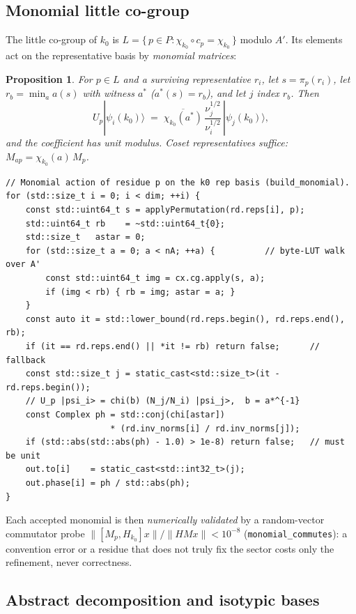 \documentclass[11pt]{article}
\newtheorem{prop}{Proposition}[section]
\newcommand{\ket}[1]{|#1\rangle}
\begin{document}
\subsection{Monomial little co-group}

The little co-group of $k_0$ is
$L = \{\,p \in P : \chi_{k_0} \circ c_p = \chi_{k_0}\,\}$ modulo $A'$.
Its elements act on the representative basis by \emph{monomial matrices}:

\begin{prop}\label{prop:monomial}
For $p \in L$ and a surviving representative $r_i$, let
$s = \pi_p(r_i)$, let $r_b = \min_a a(s)$ with witness $a^*$
($a^*(s) = r_b$), and let $j$ index $r_b$. Then
\[
  U_p \ket{\psi_i(k_0)} \;=\;
  \overline{\chi_{k_0}(a^*)}\,
  \frac{\nu_j^{1/2}}{\nu_i^{1/2}}\,
  \ket{\psi_j(k_0)},
\]
and the coefficient has unit modulus. Coset representatives suffice:
$M_{a p} = \chi_{k_0}(a)\, M_p$.
\end{prop}

\begin{lstlisting}
// Monomial action of residue p on the k0 rep basis (build_monomial).
for (std::size_t i = 0; i < dim; ++i) {
    const std::uint64_t s = applyPermutation(rd.reps[i], p);
    std::uint64_t rb    = ~std::uint64_t{0};
    std::size_t   astar = 0;
    for (std::size_t a = 0; a < nA; ++a) {          // byte-LUT walk over A'
        const std::uint64_t img = cx.cg.apply(s, a);
        if (img < rb) { rb = img; astar = a; }
    }
    const auto it = std::lower_bound(rd.reps.begin(), rd.reps.end(), rb);
    if (it == rd.reps.end() || *it != rb) return false;      // fallback
    const std::size_t j = static_cast<std::size_t>(it - rd.reps.begin());
    // U_p |psi_i> = chi(b) (N_j/N_i) |psi_j>,  b = a*^{-1}
    const Complex ph = std::conj(chi[astar])
                     * (rd.inv_norms[i] / rd.inv_norms[j]);
    if (std::abs(std::abs(ph) - 1.0) > 1e-8) return false;   // must be unit
    out.to[i]    = static_cast<std::int32_t>(j);
    out.phase[i] = ph / std::abs(ph);
}
\end{lstlisting}

Each accepted monomial is then \emph{numerically validated} by a random-vector
commutator probe $\lVert [M_p, H_{k_0}] x \rVert / \lVert H M x \rVert <
10^{-8}$ (\texttt{monomial\_commutes}): a convention error or a residue that
does not truly fix the sector costs only the refinement, never correctness.

\subsection{Abstract decomposition and isotypic bases}
\end{document}
